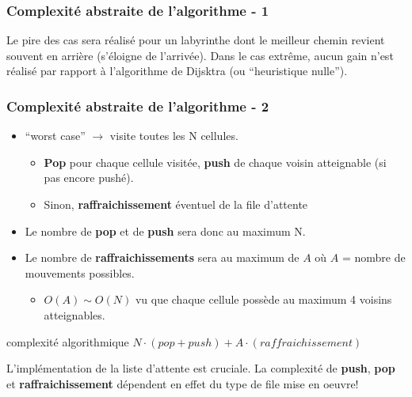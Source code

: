 \documentclass[]{beamer}
\begin{document}
\begin{frame}
  \frametitle{Complexité abstraite de l'algorithme - 1}
  Le pire des cas sera réalisé pour un labyrinthe dont le meilleur chemin revient
  souvent en arrière (s'éloigne de l'arrivée). Dans le cas extrême, aucun gain n'est
  réalisé par rapport à l'algorithme de Dijsktra (ou ``heuristique nulle'').
  \par\medskip
\end{frame}
\begin{frame}
  \frametitle{Complexité abstraite de l'algorithme - 2}
  \begin{itemize}
  \item ``worst case'' $\rightarrow$ visite toutes les N cellules. 
   \begin{itemize} 
   \item \textbf {Pop} pour chaque cellule visitée, \textbf {push} de chaque voisin atteignable (si pas encore pushé). 
   \item Sinon, \textbf {raffraichissement} éventuel de la file d'attente 
   \end{itemize}
  \item Le nombre de \textbf {pop} et de \textbf {push} sera donc au maximum N.
  \item Le nombre de \textbf {raffraichissements} sera au maximum de $A$ 
  où $A$ = nombre de mouvements possibles.
    \begin{itemize} 
    \item $O({A}) \sim O({N})$ vu que chaque cellule possède au maximum 4 voisins atteignables.
    \end{itemize}
   \end{itemize}
  \begin{block}{complexité algorithmique}
  $N \cdot (pop + push) + A \cdot (raffraichissement)$
  \end{block}
   L'implémentation de la liste d'attente est cruciale.  La complexité de \textbf {push}, \textbf {pop} et \textbf {raffraichissement} dépendent en effet du type de file mise en oeuvre!
\end{frame}
\end{document}
